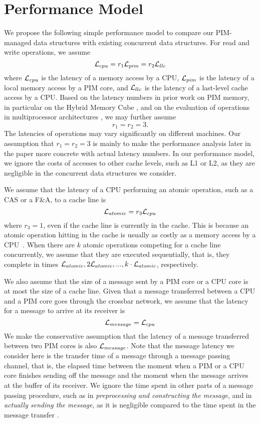 \section{Performance Model}
\label{section:performance_model}
We propose the following simple performance model to compare 
our PIM-managed data structures with existing concurrent data structures.
For read and write operations, we assume 
$$\mathcal{L}_{cpu} = r_1\mathcal{L}_{pim} = r_2\mathcal{L}_{llc}$$
where $\mathcal{L}_{cpu}$ is the latency of a memory access by a CPU,
$\mathcal{L}_{pim}$ is the latency of a local memory access by a PIM core, and
$\mathcal{L}_{llc}$ is the latency of a last-level cache access by a CPU.
Based on the latency numbers in prior work on PIM memory, 
in particular on the Hybrid Memory Cube \cite{website:HMC, Azarkhish16}, 
and on the evaluation of operations in multiprocessor architectures \cite{David13},
we may further assume 
$$r_1 = r_2 = 3.$$ 
The latencies of operations may vary significantly on different machines.  
Our assumption that $r_1 = r_2 = 3$ is mainly to make the performance analysis later in the paper 
more concrete with actual latency numbers. 
In our performance model, we ignore the costs of accesses to other cache levels, such as L1 or L2, 
as they are negligible in the concurrent data structures we consider.

We assume that the latency of a CPU performing an atomic operation, such as a CAS or a F\&A,
to a cache line is 
$$\mathcal{L}_{atomic} = r_3\mathcal{L}_{cpu}$$ 
where $r_3 = 1$, even if the cache line is currently in the cache.
This is because an atomic operation hitting in the cache is usually 
as costly as a memory access by a CPU~\cite{David13}.
When there are $k$ atomic operations competing for a cache line concurrently,
we assume that they are executed sequentially, that is,
they complete in times $\mathcal{L}_{atomic}, 2\mathcal{L}_{atomic},..., k\cdot\mathcal{L}_{atomic}$, respectively.

We also assume that the size of a message sent by a PIM core or a CPU core is at most 
the size of a cache line.
Given that a message transferred between a CPU and a PIM core goes through
the crossbar network, we assume that the latency for a message to arrive at its receiver is 
$$\mathcal{L}_{message} = \mathcal{L}_{cpu}$$
We make the conservative assumption that the latency of a message transferred 
between two PIM cores is also $\mathcal{L}_{message}$.
Note that the message latency we consider here is the transfer time of a message
through a message passing channel, that is, the elapsed time between the moment 
when a PIM or a CPU core finishes sending off the message and the moment when the message arrives at the buffer of its receiver.
We ignore the time spent in other parts of a message passing procedure,
such as in \emph{preprocessing and constructing the message}, and in \emph{actually sending the message},
as it is negligible compared to the time spent in the message transfer \cite{Azarkhish16}.